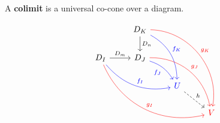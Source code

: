 \begin{definition}
  A \textbf{colimit} is a universal co-cone over a diagram.
\end{definition}

\[
    \begin{tikzcd}
      & D_K \arrow{d}{D_n}
      \arrow[bend left=30,color=blue]{ddr}{f_K}
      \arrow[bend left=50,color=red]{dddrr}{g_K} & & \\
      D_I \arrow{r}{D_m}
      \arrow[bend right=30,color=blue]{drr}{f_I}
      \arrow[bend right=40,color=red]{ddrrr}{g_I} &
      D_J \arrow[bend left=20,swap, color=blue]{dr}{f_J}
      \arrow[bend left=40,color=red]{ddrr}{g_J} & & \\
      & & {\color{blue}U} \arrow[dashed]{dr}{h}& \\
      & & & {\color{red}V}
    \end{tikzcd}
\]




